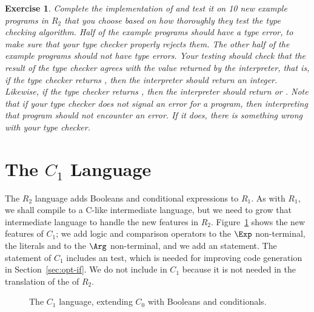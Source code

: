 \documentclass[11pt]{book}
\newcommand{\gray}[1]{{\color{lightgray} #1}}
\newtheorem{exercise}[theorem]{Exercise}
\begin{document}
\begin{exercise}\normalfont
Complete the implementation of  and test it on 10
new example programs in $R_2$ that you choose based on how thoroughly
they test the type checking algorithm. Half of the example programs
should have a type error, to make sure that your type checker properly
rejects them. The other half of the example programs should not have
type errors. Your testing should check that the result of the type
checker agrees with the value returned by the interpreter, that is, if
the type checker returns , then the interpreter should
return an integer. Likewise, if the type checker returns
, then the interpreter should return  or
. Note that if your type checker does not signal an error
for a program, then interpreting that program should not encounter an
error.  If it does, there is something wrong with your type checker.
\end{exercise}

\section{The $C_1$ Language}
\label{sec:c1}

The $R_2$ language adds Booleans and conditional expressions to $R_1$.
As with $R_1$, we shall compile to a C-like intermediate language, but
we need to grow that intermediate language to handle the new features
in $R_2$. Figure~\ref{fig:c1-syntax} shows the new features of $C_1$;
we add logic and comparison operators to the $\Exp$ non-terminal, the
literals  and  to the $\Arg$ non-terminal, and we
add an  statement. The  statement of $C_1$ includes an
 test, which is needed for improving code generation in
Section~\ref{sec:opt-if}.  We do not include  in $C_1$
because it is not needed in the translation of the  of $R_2$.

\begin{figure}[tp]
\fbox{
\begin{minipage}{0.96\textwidth}
\[
\begin{array}{lcl}
\Arg &::=& \gray{\Int \mid \Var} \mid \key{\#t} \mid \key{\#f} \\
\itm{cmp} &::= & \key{eq?} \mid \key{<} \mid \key{<=} \mid \key{>} \mid \key{>=} \\
\Exp &::= & \gray{\Arg \mid (\key{read}) \mid (\key{-}\;\Arg) \mid (\key{+} \; \Arg\;\Arg)}
      \mid (\key{not}\;\Arg) \mid (\itm{cmp}\;\Arg\;\Arg) \\
\Stmt &::=& \gray{\ASSIGN{\Var}{\Exp} \mid \RETURN{\Arg}} \\
      &\mid& \IF{(\itm{cmp}\, \Arg\,\Arg)}{\Stmt^{*}}{\Stmt^{*}} \\
C_1 & ::= & (\key{program}\;(\Var^{*})\;(\key{type}\;\textit{type})\;\Stmt^{+})
\end{array}
\]
\end{minipage}
}
\caption{The $C_1$ language, extending $C_0$ with Booleans and conditionals.}
\label{fig:c1-syntax}
\end{figure}
\end{document}
